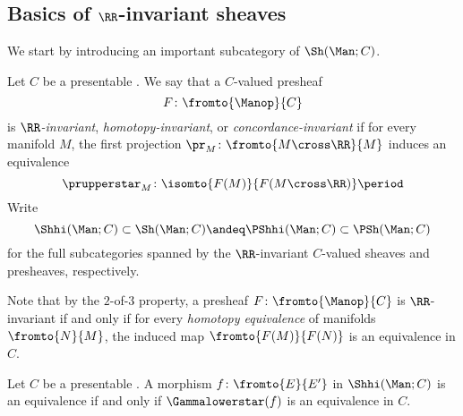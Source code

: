 
\subsection{Basics of \texorpdfstring{$ \RR $}{ℝ}-invariant sheaves}\label{sec:RRinvarbasics}

We start by introducing an important subcategory of $ \Sh(\Man;C) $.

\begin{definition}
	Let $ C $ be a presentable \category.
	We say that a $ C $-valued presheaf
	\begin{equation*}
		F \colon \fromto{\Manop}{C}
	\end{equation*}
	is \textit{$ \RR $-invariant}, \textit{homotopy-invariant}, or \textit{concordance-invariant} if for every manifold $ M $, the first projection $ \pr_M \colon \fromto{M \cross \RR}{M} $ induces an equivalence
	\begin{equation*}
		\prupperstar_M \colon \isomto{F(M)}{F(M \cross \RR)} \period
	\end{equation*}
	Write
	\begin{equation*}
		\Shhi(\Man;C) \subset \Sh(\Man;C) \andeq \PShhi(\Man;C) \subset \PSh(\Man;C)
	\end{equation*}
	for the full subcategories spanned by the $ \RR $-invariant $ C $-valued sheaves and presheaves, respectively.
\end{definition}

\begin{remark}
	Note that by the $ 2 $-of-$ 3 $ property, a presheaf $ F \colon \fromto{\Manop}{C} $ is $ \RR $-invariant if and only if for every \textit{homotopy equivalence} of manifolds $ \fromto{N}{M} $, the induced map $ \fromto{F(M)}{F(N)} $ is an equivalence in $ C $.
\end{remark}

\begin{lemma}\label{lem:checkequivforhionpt}
	Let $ C $ be a presentable \category.
	A morphism $ f \colon \fromto{E}{E'} $ in $ \Shhi(\Man;C) $ is an equivalence if and only if $ \Gammalowerstar(f) $ is an equivalence in $ C $.
\end{lemma}

